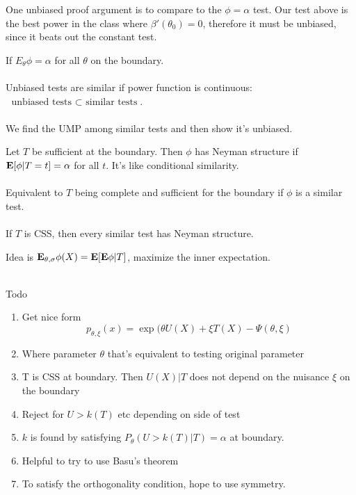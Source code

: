 \documentclass{article}
\begin{document}
One unbiased proof argument is to compare to the $\phi = \alpha$ test. Our test above is the best power in the class where $\beta'(\theta_0) = 0$, therefore it must be unbiased, since it beats out the constant test.


\begin{definition}
If $E_\theta \phi = \alpha$ for all $\theta$ on the boundary. \\\\
Unbiased tests are similar if power function is continuous: $\text{ unbiased tests } \subset \text{ similar tests}$.\\\\
We find the UMP among similar tests and then show it's unbiased.
\end{definition}
\begin{definition}
Let $T$ be sufficient at the boundary. Then $\phi$ has Neyman structure if $\mathbf{E} [\phi | T=t] = \alpha$ for all $t$. It's like conditional similarity. \\\\

Equivalent to $T$ being complete and sufficient for the boundary if $\phi$ is a similar test. \\\\

If $T$ is CSS, then every similar test has Neyman structure. 
\end{definition}

Idea is $\mathbf{E}_{\theta, \sigma} \phi (X) = \mathbf{E} [\mathbf{E} \phi | T] $, maximize the inner expectation. \\\\

\begin{recipe}
Todo
\begin{enumerate}
	\item Get nice form
	$$p_{\theta, \xi} (x) = \exp(\theta U(X) + \xi T(X) - \Psi(\theta,\xi)$$
	\item Where parameter $\theta$ that's equivalent to testing original parameter
	\item T is CSS at boundary. Then $U(X)|T$ does not depend on the nuisance $\xi$ on the boundary
	\item Reject for $U > k(T)$ etc depending on side of test
	\item $k$ is found by satisfying $P_\theta (U > k(T) | T) = \alpha$ at boundary. 
	\item Helpful to try to use Basu's theorem 
	\item To satisfy the orthogonality condition, hope to use symmetry.
\end{enumerate}
\end{recipe}
\end{document}
